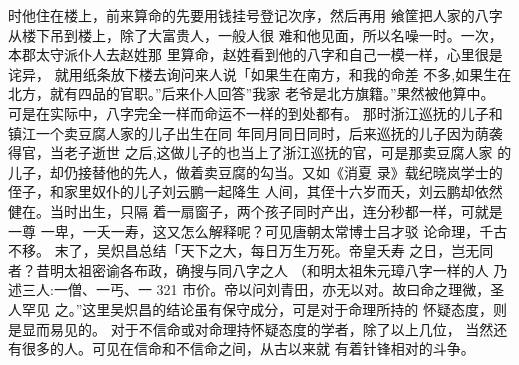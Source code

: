 时他住在楼上，前来算命的先要用钱挂号登记次序，然后再用
飨筐把人家的八字从楼下吊到楼上，除了大富贵人，一般人很
难和他见面，所以名噪一时。一次，本郡太守派仆人去赵姓那
里算命，赵姓看到他的八字和自己一模一样，心里很是诧异，
就用纸条放下楼去询问来人说「如果生在南方，和我的命差
不多,如果生在北方，就有四品的官职。”后来仆人回答”我家
老爷是北方旗籍。”果然被他算中。
可是在实际中，八字完全一样而命运不一样的到处都有。
那时浙江巡抚的儿子和镇江一个卖豆腐人家的儿子出生在同
年同月同日同时，后来巡抚的儿子因为荫袭得官，当老子逝世
之后,这做儿子的也当上了浙江巡抚的官，可是那卖豆腐人家
的儿子，却仍接替他的先人，做着卖豆腐的勾当。又如《消夏
录》载纪晓岚学士的侄子，和家里奴仆的儿子刘云鹏一起降生
人间，其侄十六岁而夭，刘云鹏却依然健在。当时出生，只隔
着一扇窗子，两个孩子同时产出，连分秒都一样，可就是一尊
一卑，一夭一寿，这又怎么解释呢？可见唐朝太常博士吕才驳
论命理，千古不移。
末了，吴炽昌总结「天下之大，每日万生万死。帝皇夭寿
之日，岂无同者？昔明太祖密谕各布政，确搜与同八字之人
（和明太祖朱元璋八字一样的人 乃述三人:一僧、一丐、一
321 
市价。帝以问刘青田，亦无以对。故曰命之理微，圣人罕见
之。”这里吴炽昌的结论虽有保守成分，可是对于命理所持的
怀疑态度，则是显而易见的。
对于不信命或对命理持怀疑态度的学者，除了以上几位，
当然还有很多的人。可见在信命和不信命之间，从古以来就
有着针锋相对的斗争。

